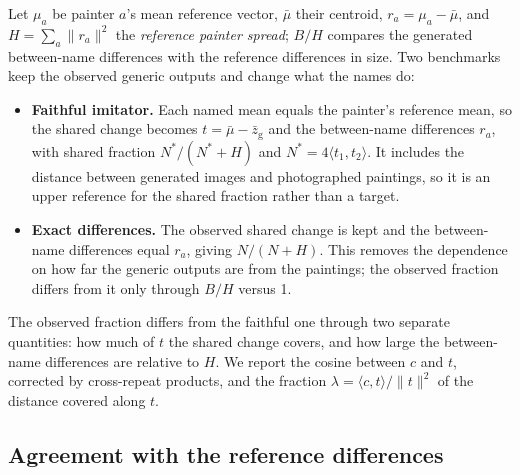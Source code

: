 \documentclass[10pt]{article}
\newcommand{\ip}[2]{\langle #1,#2\rangle}
\begin{document}
Let $\mu_a$ be painter $a$'s mean reference vector, $\bar\mu$ their centroid, $r_a=\mu_a-\bar\mu$,
and $H=\sum_a\|r_a\|^2$ the \emph{reference painter spread}; $B/H$ compares the generated
between-name differences with the reference differences in size. Two benchmarks keep the observed
generic outputs and change what the names do:
\begin{itemize}
\item \textbf{Faithful imitator.} Each named mean equals the painter's reference mean, so the
shared change becomes $t=\bar\mu-\bar z_{\mathrm{g}}$ and the between-name differences $r_a$, with
shared fraction $N^*/(N^*+H)$ and $N^*=4\ip{t_1}{t_2}$. It includes the distance between generated
images and photographed paintings, so it is an upper reference for the shared fraction rather than
a target.
\item \textbf{Exact differences.} The observed shared change is kept and the between-name
differences equal $r_a$, giving $N/(N+H)$. This removes the dependence on how far the generic
outputs are from the paintings; the observed fraction differs from it only through $B/H$
versus 1.
\end{itemize}
The observed fraction differs from the faithful one through two separate quantities: how much of
$t$ the shared change covers, and how large the between-name differences are relative to $H$.
We report the cosine between $c$ and $t$, corrected by cross-repeat products, and the fraction
$\lambda=\ip{c}{t}/\|t\|^2$ of the distance covered along $t$.

\subsection{Agreement with the reference differences}\label{sec:agreement-method}
\end{document}
